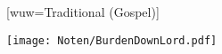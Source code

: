 [wuw={Traditional (Gospel)}]

\beginverse
\endverse
\centering\texttt{[image: Noten/BurdenDownLord.pdf]}



\endsong
